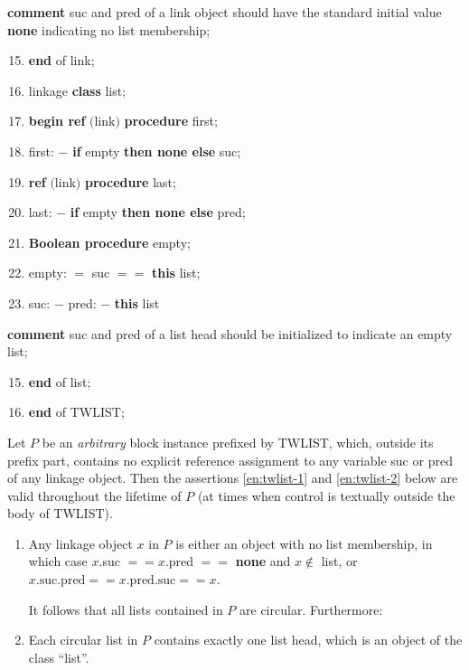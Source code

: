 \documentclass[twoside,11pt]{book}
\begin{document}
\parindent\quad \quad \quad \textbf{comment} suc and pred of a link object should have the standard initial value \textbf{none} indicating no list membership;

\begin{enumerate}[nosep, label=\arabic*.]
	\setcounter{enumi}{14}
	\item \quad \textbf{end} of link;
	\item \quad linkage \textbf{class} list;
	\item \quad \textbf{begin ref} $($link$)$ \textbf{procedure} first;
	\item \quad \quad \quad first: $-$ \textbf{if} empty \textbf{then none else} suc;
	\item \quad \quad \textbf{ref} $($link$)$ \textbf{procedure} last;
	\item \quad \quad \quad last: $-$ \textbf{if} empty \textbf{then none else} pred;
	\item \quad \quad \textbf{Boolean procedure} empty;
	\item \quad \quad \quad empty: $=$ suc $==$ \textbf{this} list;
	\item \quad \quad \quad suc: $-$ pred: $-$ \textbf{this} list
\end{enumerate}

\parindent\quad \quad \quad \quad \textbf{comment} suc and pred of a list head should be initialized to indicate an empty list;

\begin{enumerate}[nosep, label=\arabic*.]
	\setcounter{enumi}{14}

	\item \quad \textbf{end} of list;
	\item \textbf{end} of TWLIST;
\end{enumerate}

Let $P$ be an \textit{arbitrary} block instance prefixed by TWLIST, which, outside its prefix part, contains no explicit reference assignment to any variable suc or pred of any linkage object. Then the assertions \ref{en:twlist-1} and \ref{en:twlist-2} below are valid throughout the lifetime of $P$ (at times when control is textually outside the body of TWLIST).

\begin{enumerate}[wide, nosep, label=(\arabic*)]
	\item \label{en:twlist-1}
	Any linkage object $x$ in $P$ is either an object with no list membership, in which case $x$.suc $== x$.pred $==$ \textbf{none} and $x \notin$ list, or $x\text{.suc.pred} == x\text{.pred.suc} == x$. 
	
	It follows that all lists contained in $P$ are circular. Furthermore:
	
	\item \label{en:twlist-2}
	Each circular list in $P$ contains exactly one list head, which is an object of the class ``list''.
\end{enumerate}
\end{document}
